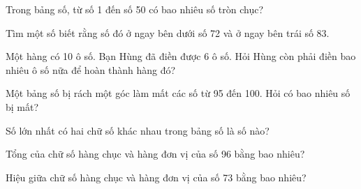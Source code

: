 \begin{ex}
Trong bảng số, từ số 1 đến số 50 có bao nhiêu số tròn chục?
\end{ex}

\begin{ex}
Tìm một số biết rằng số đó ở ngay bên dưới số 72 và ở ngay bên trái số 83.
\end{ex}

\begin{ex}
Một hàng có 10 ô số. Bạn Hùng đã điền được 6 ô số. Hỏi Hùng còn phải điền bao nhiêu ô số nữa để hoàn thành hàng đó?
\end{ex}

\begin{ex}
Một bảng số bị rách một góc làm mất các số từ 95 đến 100. Hỏi có bao nhiêu số bị mất?
\end{ex}

\begin{ex}
Số lớn nhất có hai chữ số khác nhau trong bảng số là số nào?
\end{ex}

\begin{ex}
Tổng của chữ số hàng chục và hàng đơn vị của số 96 bằng bao nhiêu?
\end{ex}

\begin{ex}
Hiệu giữa chữ số hàng chục và hàng đơn vị của số 73 bằng bao nhiêu?
\end{ex}
